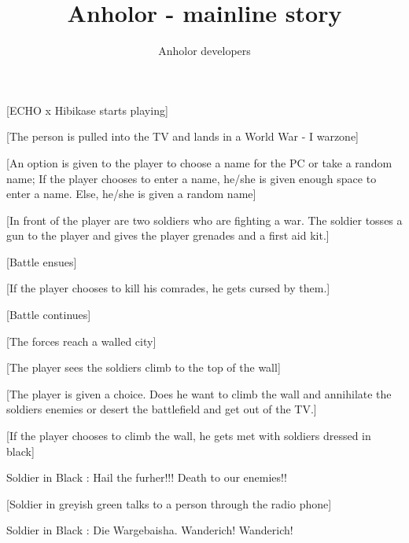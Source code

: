 \documentclass[a4paper,12pt]{report}
\title {Anholor - mainline story}
\author {Anholor developers}
\begin{document}
\newline

[ECHO x Hibikase starts playing]\newline

[The person is pulled into the TV and lands in a World War - I warzone]\newline

[An option is given to the player to choose a name for the PC or take a random name; If the player chooses to enter a name, he/she is given enough space to enter a name. Else, he/she is given a random name]\newline

[In front of the player are two soldiers who are fighting a war. The soldier tosses a gun to the player and gives the player grenades and a first aid kit.]\newline

[Battle ensues]\newline

[If the player chooses to kill his comrades, he gets cursed by them.]\newline

[Battle continues]\newline

[The forces reach a walled city]\newline

[The player sees the soldiers climb to the top of the wall]\newline

[The player is given a choice. Does he want to climb the wall and annihilate the soldiers enemies or desert the battlefield and get out of the TV.]\newline

[If the player chooses to climb the wall, he gets met with soldiers dressed in black]\newline

Soldier in Black : Hail the furher!!! Death to our enemies!!\newline

[Soldier in greyish green talks to a person through the radio phone]\newline

Soldier in Black : Die Wargebaisha. Wanderich! Wanderich!\newline
\end{document}
